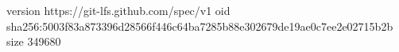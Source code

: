 version https://git-lfs.github.com/spec/v1
oid sha256:5003f83a873396d28566f446c64ba7285b88e302679de19ae0c7ee2e02715b2b
size 349680
